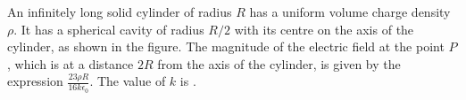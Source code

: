 
\item An infinitely long solid cylinder of radius $R$ has a uniform volume charge density $\rho$. It has a spherical cavity of radius $R/2$ with its centre on the axis of the cylinder, as shown in the figure. The magnitude of the electric field at the point $P$, which is at a distance $2R$ from the axis of the cylinder, is given by the expression $\frac{23\rho R}{16k\epsilon_0}$. The value of $k$ is \underline{\hspace{2.5cm}}.
    \begin{center}
    \end{center}
